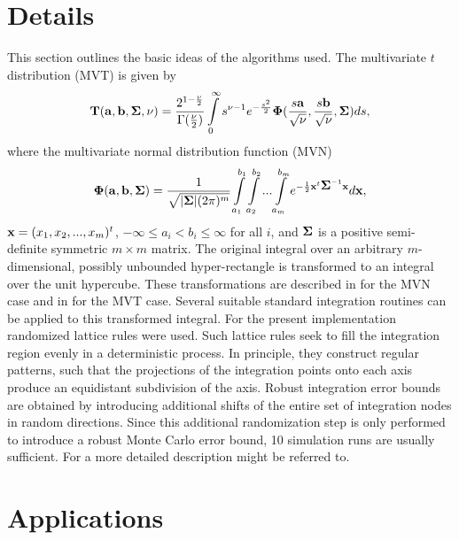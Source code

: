 \documentclass[11pt]{amsart}
\newcommand{\ba}{{\bf a}}
\newcommand{\bb}{{\bf b}}
\newcommand{\bx}{{\bf x}}
\newcommand{\bT}{{\bf T}}
\newcommand{\Sig}{\mbox{\boldmath $\Sigma$}}
\newcommand{\Ph}{\mbox{\boldmath $\Phi$}}
\begin{document}
\section{Details \label{details}}

This section outlines the basic ideas of the algorithms used. The
multivariate $t$ distribution (MVT) is given by $$ \bT(\ba, \bb,
\Sig, \nu) = \frac{2^{1-\frac{\nu}{2}}}{\Gamma(\frac{\nu}{2})}
\int\limits_0^{\infty}s^{\nu-1}e^{-\frac{s^2}{2}}
\Ph(\frac{s\ba}{\sqrt{\nu}},\frac{s\bb}{\sqrt{\nu}},\Sig) ds, $$
where the multivariate normal distribution function (MVN) $$
\Ph(\ba,\bb, \Sig) = \frac{1}{\sqrt{|\Sig| (2\pi)^m}}
\int\limits_{a_1}^{b_1} \int\limits_{a_2}^{b_2} ...
\int\limits_{a_m}^{b_m} e^{- \frac{1}{2} \bx^t \Sig^{-1} \bx}
d\bx, $$ $\bx = (x_1, x_2, ..., x_m)^t$, $-\infty \leq a_i < b_i
\leq \infty$ for all $i$, and $\Sig$ is a positive semi-definite
symmetric $m \times m$ matrix. The original integral over an
arbitrary $m$-dimensional, possibly unbounded hyper-rectangle is
transformed to an integral over the unit hypercube. These
transformations are described in \cite{numerical-:1992} for the
MVN case and in \cite{numerical-:1999} for the MVT case. Several
suitable standard integration routines can be applied to this
transformed integral. For the present implementation randomized
lattice rules were used. Such lattice rules seek to fill the
integration region evenly in a deterministic process. In
principle, they construct regular patterns, such that the
projections of the integration points onto each axis produce an
equidistant subdivision of the axis. Robust integration error
bounds are obtained by introducing additional shifts of the
entire set of integration nodes in random directions. Since this
additional randomization step is only performed to introduce a
robust Monte Carlo error bound, 10 simulation runs are usually
sufficient. For a more detailed description \cite{numerical-:1999}
might be referred to.

\section{Applications \label{appl}}
\end{document}
